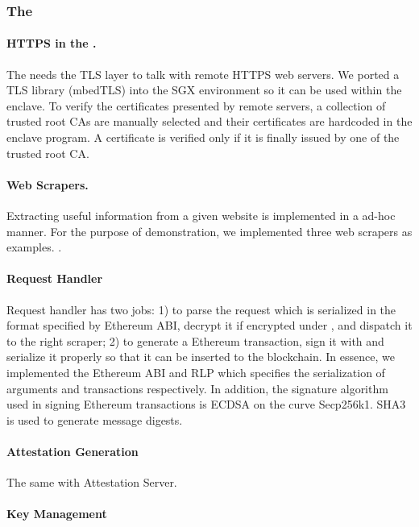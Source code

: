 \subsubsection{The \encname}

\paragraph{HTTPS in the \encname.} 
The \encname needs the TLS layer to talk with remote HTTPS web servers.  We
ported a TLS library (mbedTLS) into the SGX environment so it can be used within
the enclave.  To verify the certificates presented by remote servers, a
collection of trusted root CAs are manually selected  and their
certificates are hardcoded in the enclave program. A certificate is verified
only if it is finally issued by one of the trusted root CA.

\paragraph{Web Scrapers.} Extracting useful information from a given website is
implemented in a ad-hoc manner. For the purpose of demonstration, we implemented
three web scrapers as examples. .

\paragraph{Request Handler} Request handler has two jobs: 1) to parse the
request which is serialized in the format specified by Ethereum ABI, decrypt it if encrypted under
\pkTC, and dispatch it to the right scraper; 2) to generate a Ethereum
transaction, sign it with \pkTC and serialize it properly so that it can be
inserted to the blockchain. In essence, we implemented the Ethereum ABI and RLP which
specifies the serialization of arguments and transactions respectively.
In addition, the signature algorithm used in signing Ethereum transactions is
ECDSA on the curve Secp256k1. SHA3 is used to generate message digests.

\paragraph{Attestation Generation} The same with Attestation Server.
\paragraph{Key Management} 
